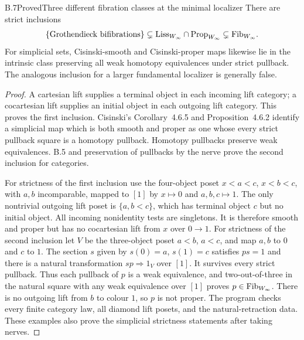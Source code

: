 \begin{claim}{B.7}{Proved}{Three different fibration classes at the minimal localizer}
There are strict inclusions
\[
 \{\text{Grothendieck bifibrations}\}\subsetneq
 \mathrm{Liss}_{W_\infty}\cap\mathrm{Prop}_{W_\infty}\subsetneq\mathrm{Fib}_{W_\infty}.
\]
For simplicial sets, Cisinski-smooth and Cisinski-proper maps likewise lie in
the intrinsic class preserving all weak homotopy equivalences under strict
pullback. The analogous inclusion for a larger fundamental localizer is
generally false.
\end{claim}
\begin{proof}
A cartesian lift supplies a terminal object in each incoming lift category;
a cocartesian lift supplies an initial object in each outgoing lift category.
This proves the first inclusion. Cisinski's Corollary~4.6.5 and
Proposition~4.6.2 identify a simplicial map which is both smooth and proper
as one whose every strict pullback square is a homotopy pullback. Homotopy
pullbacks preserve weak equivalences. B.5 and preservation of pullbacks by
the nerve prove the second inclusion for categories.

For strictness of the first inclusion use the four-object poset
$x<a<c$, $x<b<c$, with $a,b$ incomparable, mapped to $[1]$ by
$x\mapsto0$ and $a,b,c\mapsto1$. The only nontrivial outgoing lift poset is
$\{a,b<c\}$, which has terminal object $c$ but no initial object. All incoming
nonidentity tests are singletons. It is therefore smooth and proper but has
no cocartesian lift from $x$ over $0\to1$.
For strictness of the second inclusion let $V$ be the three-object poset
$a<b$, $a<c$, and map $a,b$ to $0$ and $c$ to $1$.
The section $s$ given by $s(0)=a$, $s(1)=c$ satisfies $ps=1$ and
there is a natural transformation $sp\Rightarrow1_V$ over $[1]$.
It survives every strict pullback. Thus each pullback of $p$ is a weak
equivalence, and two-out-of-three in the natural square with any weak
equivalence over $[1]$ proves $p\in\mathrm{Fib}_{W_\infty}$.
There is no outgoing lift from $b$ to colour $1$, so $p$ is not proper.
The program checks every finite category law, all diamond lift posets,
and the natural-retraction data. These examples also prove the simplicial
strictness statements after taking nerves.
\end{proof}

